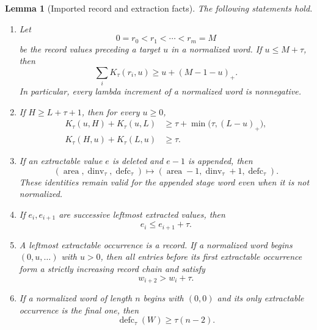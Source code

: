 \documentclass[11pt]{article}
\newtheorem{lemma}[theorem]{Lemma}
\theoremstyle{definition}
\theoremstyle{remark}
\newcommand{\area}{\operatorname{area}}
\newcommand{\dinv}{\operatorname{dinv}}
\newcommand{\defc}{\operatorname{defc}}
\begin{document}
\begin{lemma}[Imported record and extraction facts]
\label{lem:imported}
The following statements hold.
\begin{enumerate}[label=\textup{(\roman*)}]
 \item Let
 \[
 0=r_0<r_1<\cdots<r_m=M
 \]
 be the record values preceding a target $u$ in a normalized word.
 If $u\le M+\tau$, then
 \begin{equation}
  \sum_iK_\tau(r_i,u)\ge u+(M-1-u)_+.
  \label{eq:strong-record}
 \end{equation}
 In particular, every lambda increment of a normalized word is
 nonnegative.

 \item If $H\ge L+\tau+1$, then for every $u\ge0$,
 \begin{align}
  K_\tau(u,H)+K_\tau(u,L)
   &\ge \tau+\min\bigl(\tau,(L-u)_+\bigr),
   \label{eq:forward-far}\\
  K_\tau(H,u)+K_\tau(L,u)&\ge\tau.
   \label{eq:reverse-far}
 \end{align}

 \item If an extractable value $e$ is deleted and $e-1$ is appended,
 then
 \begin{equation}
  (\area,\dinv_\tau,\defc_\tau)
  \longmapsto
  (\area-1,\dinv_\tau+1,\defc_\tau).
  \label{eq:transport}
 \end{equation}
 These identities remain valid for the appended stage word even when it
 is not normalized.

 \item If $e_i,e_{i+1}$ are successive leftmost extracted values, then
 \begin{equation}
  e_i\le e_{i+1}+\tau.
  \label{eq:successive}
 \end{equation}

 \item A leftmost extractable occurrence is a record.  If a normalized
 word begins $(0,u,\ldots)$ with $u>0$, then all entries before its first
 extractable occurrence form a strictly increasing record chain and
 satisfy
 \begin{equation}
  w_{i+2}>w_i+\tau.
  \label{eq:rapid-propagation}
 \end{equation}

 \item If a normalized word of length $n$ begins with $(0,0)$ and its
 only extractable occurrence is the final one, then
 \begin{equation}
  \defc_\tau(W)\ge\tau(n-2).
  \label{eq:double-zero-boundary}
 \end{equation}
\end{enumerate}
\end{lemma}
\end{document}
